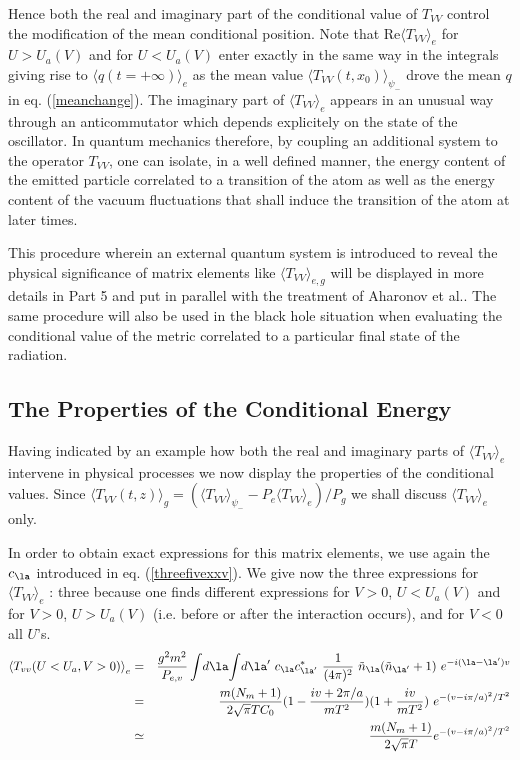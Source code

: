 Hence both the real and imaginary part of the conditional value
  of $T_{VV}$ control the
modification of the mean conditional
position. Note that
Re$\langle T_{VV}\rangle_e$ for $U>U_a(V)$ and for $U<U_a(V)$
enter exactly in the same
way in the integrals giving rise to $\langle q(t=+\infty)
\rangle_e$ as the mean value $\langle T_{VV}(t,x_0)\rangle_{\psi_-}$
drove the mean $q$ in eq. (\ref{meanchange}). The imaginary part
of $\langle T_{VV}\rangle_e$ appears in an unusual way
through an anticommutator which
depends explicitely on the state of the oscillator. In
quantum mechanics therefore, by coupling an additional system
 to the operator $T_{VV}$, one can
isolate, in a well defined manner, the energy content of the emitted particle
correlated
to a transition of the atom as well as the energy content of
the vacuum fluctuations
that shall induce the transition of the atom at  later times.

This
procedure
wherein an external quantum system is introduced to
reveal the physical significance of matrix elements like
$\langle T_{VV}\rangle_{e,g}$ will be displayed in more details in Part 5
and put in parallel with the treatment of Aharonov et al.\cite{aharo}.
The same procedure
will also be used in the black hole situation when evaluating the
conditional value of the metric correlated to
a particular final state of the radiation.

\subsection{The Properties of the Conditional Energy}\label{conded}

Having indicated by an example how both the real and
imaginary parts of $\langle T_{VV}\rangle_e$ intervene in
physical processes we now display the properties of the conditional values.
Since
$\langle T_{VV}(t,z)\rangle_g =
( \langle T_{VV}\rangle_{\psi_-} - P_e \langle T_{VV}\rangle_e )/P_g$
we shall discuss $\langle T_{VV}\rangle_e$ only.

In order to obtain exact expressions for this matrix elements,
we use again the $c_\la$ introduced in eq. (\ref{threefivexxv}).
We give now the
three
expressions for  $\langle T_{VV}\rangle_e$ : three because one finds different
expressions for
$V>0$, $U<U_a(V)$ and for
$V>0$, $U>U_a(V)$ (i.e.   before  or after
the interaction occurs), and for $V<0$ all $U$'s.
\begin{eqnarray}
\bk{T_{vv}(U<U_a, V > 0 )}_{e}
& =&
{ g^2 m^2 \over P_{e,v}}   \int\! d\la \!\int \! d\la^{\prime}\
 c_\la c_{\la^\prime}^{*}\
{1 \over (4 \pi)^2}
\ \tilde n_\la ( \tilde n_{\la^\prime} +1 )\
e^{-i(\la-\la^\prime)v} \nonumber\\
& =&
{m (N_m + 1)\over  2 \sqrt {\pi} T C_0}
 ( 1 - {i v + 2 \pi /a \over m T^2}) ( 1 + {i v \over m T^2})\
e^{ -{ (v-i \pi/a)^2 / T^2}  }
\nonumber\\ &\simeq & { m (N_m +1)\over 2 \sqrt{ \pi} T }
e^{ -{ (v-i \pi/a)^2/
T^2}  }
\label{weeki}\end{eqnarray}

